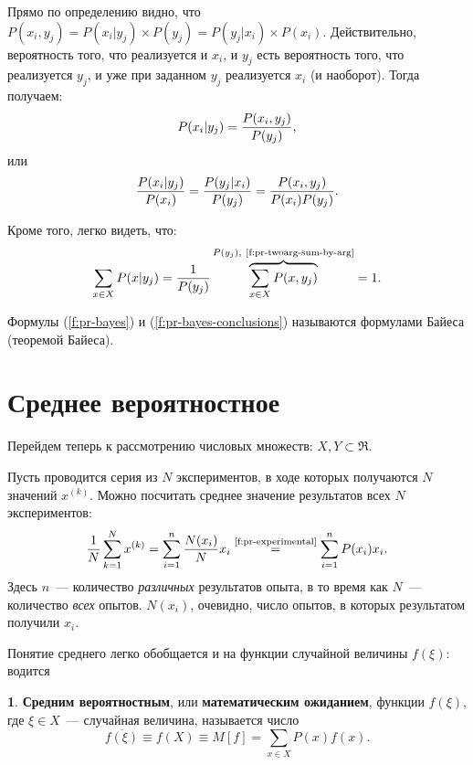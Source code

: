 \documentclass[12pt,a4paper,openright]{book}
\theoremstyle{definition}
\newtheorem{definition}{\textls[150]{Определение}}[chapter]
\numberwithin{equation}{chapter}
\begin{document}
\begin{appendices}
		Прямо по определению видно, что $P(x_i, y_j) = P(x_i | y_j) \times P(y_j) = P(y_j | x_i) \times P(x_i)$. Действительно, вероятность того, что реализуется и $x_i$, и $y_j$ есть вероятность того, что реализуется $y_j$, и уже при заданном $y_j$ реализуется $x_i$ (и наоборот). Тогда получаем:
		\begin{equation}\label{f:pr-bayes}
			P(x_i | y_j) = {P(x_i, y_j) \over P(y_j)} \text{,}
		\end{equation}
		или
		\begin{equation}\label{f:pr-bayes-conclusions}
			{P(x_i | y_j) \over P(x_i)} = {P(y_j | x_i) \over P(y_j)} = {P(x_i, y_j) \over {P(x_i) P(y_j)}} \text{.}
		\end{equation}

		Кроме того, легко видеть, что:
		\begin{equation}
			\sum\limits_{x \in X} P(x | y_j) = {1 \over P(y_j)} \overbrace{\sum\limits_{x \in X} {P(x, y_j)}}^{P(y_j), \ \textup{\autoref{f:pr-twoarg-sum-by-arg}}} = 1 \text{.}
		\end{equation}

		Формулы (\autoref{f:pr-bayes}) и (\autoref{f:pr-bayes-conclusions}) называются формулами Байеса (теоремой Байеса).

		\section{Среднее вероятностное}

		Перейдем теперь к рассмотрению числовых множеств: $X, Y \subset \Re$.

		Пусть проводится серия из $N$ экспериментов, в ходе которых получаются $N$ значений $x^{(k)}$. Можно посчитать среднее значение результатов всех $N$ экспериментов:
		$${1 \over N}\sum\limits_{k=1}^{N}x^{(k)} = \sum\limits_{i=1}^{n}{{N(x_i) \over N}x_i} \overset{\textup{\autoref{f:pr-experimental}}}{=} \sum\limits_{i=1}^{n} P(x_i) x_i \text{.}$$
		Здесь $n$~--- количество \textit{различных} результатов опыта, в то время как $N$~--- количество \textit{всех} опытов. $N(x_i)$, очевидно, число опытов, в которых результатом получили $x_i$.

		Понятие среднего легко обобщается и на функции случайной величины $f(\xi)$: водится

		\begin{definition}
			\textbf{Средним вероятностным}, или \textbf{математическим ожиданием}, функции $f(\xi)$, где $\xi \in X$~--- случайная величина, называется число
			\begin{equation}
				\overline{f(\xi)} \equiv f(X) \equiv M[f] = \sum\limits_{x \in X}{P(x)f(x)} \text{.}
			\end{equation}
		\end{definition}


\end{appendices}
\end{document}

